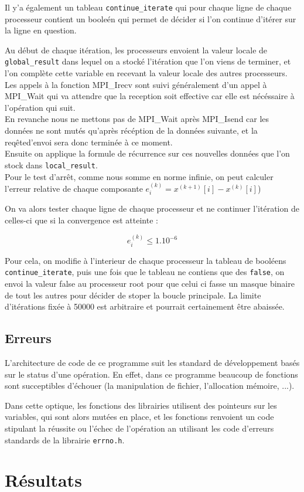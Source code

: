 \documentclass[11pt, a4paper]{article}
\begin{document}
Il y'a également un tableau \texttt{continue\_iterate} qui pour chaque ligne de chaque processeur contient un booleén qui permet de décider si l'on continue d'itérer sur la ligne en question.

Au début de chaque itération, les processeurs envoient la valeur locale de \texttt{global\_result} dans lequel on a stocké l'itération que l'on viens de terminer, et l'on complète cette variable en recevant la valeur locale des autres processeurs.\\

Les appels à la fonction MPI\_Irecv sont suivi généralement d'un appel à MPI\_Wait qui va attendre que la reception soit effective car elle est nécéssaire à l'opération qui suit.\\

En revanche nous ne mettons pas de MPI\_Wait après MPI\_Isend car les données ne sont mutés qu'après récéption de la données suivante, et la req\^eted'envoi sera donc terminée à ce moment.\\

Ensuite on applique la formule de récurrence sur ces nouvelles données que l'on stock dans \texttt{local\_result}.\\

Pour le test d'arr\^et, comme nous somme en norme infinie, on peut calculer l'erreur relative de chaque composante $e^{(k)}_{i} = x^{(k+1)}[i] - x^{(k)}[i]$)

On va alors tester chaque ligne de chaque processeur et ne continuer l'itération de celles-ci que si la convergence est atteinte :

\[
e^{(k)}_{i} \leq 1.10^{-6}
\]

Pour cela, on modifie à l'interieur de chaque processeur la tableau de booléens \texttt{continue\_iterate}, puis une fois que le tableau ne contiens que des \texttt{false}, on envoi la valeur false au processeur root pour que celui ci fasse un masque binaire de tout les autres pour décider de stoper la boucle principale. La limite d'itérations fixée à 50000 est arbitraire et pourrait certainement \^etre abaissée.

\subsection{Erreurs}

L'architecture de code de ce programme suit les standard de développement basés sur le status d'une opération. En effet, dans ce programme beaucoup de fonctions sont succeptibles d'échouer (la manipulation de fichier, l'allocation mémoire, ...).

Dans cette optique, les fonctions des librairies  utilisent des pointeurs sur les variables, qui sont alors mutées en place, et les fonctions renvoient un code stipulant la réussite ou l'échec de l'opération an utilisant les code d'erreurs standards de la librairie \texttt{errno.h}.

\newpage

\section{Résultats}
\end{document}
